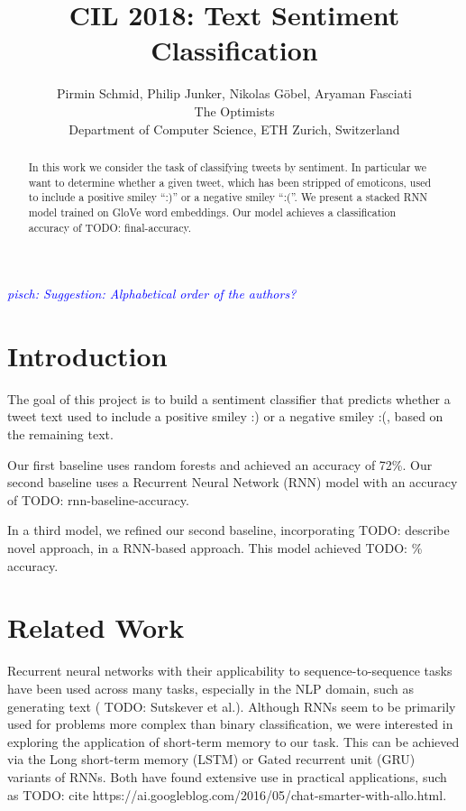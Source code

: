 \documentclass[10pt,conference,compsocconf]{IEEEtran}
\newcommand{\todo}[1]{}
\renewcommand{\todo}[1]{{\color{red} TODO: {#1}}}
\newcommand{\pisch}[1]{\textit{\textcolor{blue}{pisch: #1}}}
\begin{document}
\title{CIL 2018: Text Sentiment Classification}

\author{
  Pirmin Schmid, Philip Junker, Nikolas G\"obel, Aryaman Fasciati\\
  The Optimists\\
  Department of Computer Science, ETH Zurich, Switzerland
}

\maketitle

\pisch{Suggestion: Alphabetical order of the authors?}

\begin{abstract}
  In this work we consider the task of classifying tweets by
  sentiment. In particular we want to determine whether a given tweet,
  which has been stripped of emoticons, used to include a positive
  smiley ``:)'' or a negative smiley ``:(''. We present a stacked RNN
  model trained on GloVe word embeddings. Our model achieves a
  classification accuracy of \todo{final-accuracy}.
\end{abstract}


\section{Introduction}

The goal of this project is to build a sentiment classifier that
predicts whether a tweet text used to include a positive smiley :) or
a negative smiley :(, based on the remaining text.

Our first baseline uses random forests and achieved an accuracy of
72\%. Our second baseline uses a Recurrent Neural Network (RNN) model
with an accuracy of \todo{rnn-baseline-accuracy}.

In a third model, we refined our second baseline, incorporating
\todo{describe novel approach}, in a RNN-based approach. This model
achieved \todo{\%} accuracy.


\section{Related Work}

Recurrent neural networks with their applicability to
sequence-to-sequence tasks have been used across many tasks,
especially in the NLP domain, such as generating text (\todo{Sutskever
  et al.}). Although RNNs seem to be primarily used for problems more
complex than binary classification, we were interested in exploring
the application of short-term memory to our task. This can be achieved
via the Long short-term memory (LSTM) or Gated recurrent unit (GRU)
variants of RNNs. Both have found extensive use in practical
applications, such as \todo{cite
  https://ai.googleblog.com/2016/05/chat-smarter-with-allo.html}.
\end{document}
